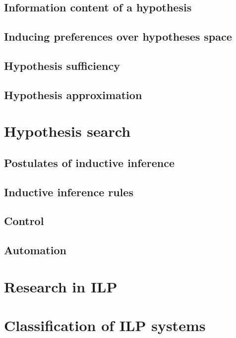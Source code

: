 \subsection{Information content of a hypothesis}
\subsection{Inducing preferences over hypotheses space}
\subsection{Hypothesis sufficiency}
\subsection{Hypothesis approximation}
\section{Hypothesis search}
\subsection{Postulates of inductive inference}
\subsection{Inductive inference rules}
\subsection{Control}
\subsection{Automation}
\section{Research in ILP}
\section{Classification of ILP systems}